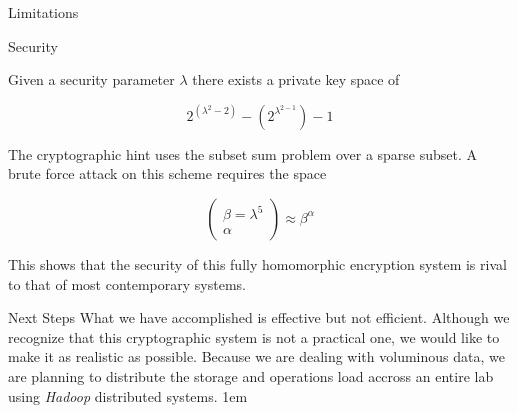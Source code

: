 \documentclass[a0,portrait]{a0poster}
\begin{document}
\begin{multicols}{2}
\begin{slide}{Limitations}

\end{slide}

\begin{slide}{Security}

Given a security parameter \(\lambda\) there exists a private key space of 

\[2^{(\lambda^2-2)} - (2^{\lambda^{2-1}})-1\]

The cryptographic hint uses the subset sum problem over a sparse subset. A brute force attack on this scheme requires the space 

\[\left(\begin{matrix}\beta = \lambda^5\\\alpha \end{matrix}\right)\approx \beta^\alpha\]

This shows that the security of this fully homomorphic encryption system is rival to that of most contemporary systems.


\end{slide}



\begin{slide}{Next Steps}
  What we have accomplished is effective but not efficient. Although we recognize that this cryptographic system is not a practical one, we would like to make it as realistic as possible. Because we are dealing with voluminous data, we are planning to distribute the storage and operations load accross an entire lab using {\em Hadoop} distributed systems. 
\parskip 1em 


\end{slide}
\end{multicols}
\end{document}
